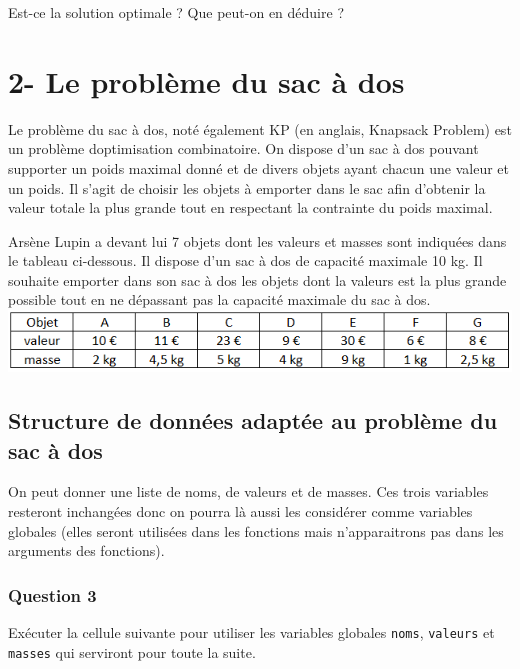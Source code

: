 \documentclass[
  paper=a4,
  ,captions=tableheading
]{scrartcl}
\begin{document}
Est-ce la solution optimale ? Que peut-on en déduire ?

\hypertarget{2--le-probluxe8me-du-sac-uxe0-dos}{%
\section{2- Le problème du sac à
dos}\label{2--le-probluxe8me-du-sac-uxe0-dos}}

Le problème du sac à dos, noté également KP (en anglais, Knapsack
Problem) est un problème d\textquotesingle optimisation combinatoire. On
dispose d'un sac à dos pouvant supporter un poids maximal donné et de
divers objets ayant chacun une valeur et un poids. Il s'agit de choisir
les objets à emporter dans le sac afin d'obtenir la valeur totale la
plus grande tout en respectant la contrainte du poids maximal.

Arsène Lupin a devant lui 7 objets dont les valeurs et masses sont
indiquées dans le tableau ci-dessous. Il dispose d'un sac à dos de
capacité maximale 10 kg. Il souhaite emporter dans son sac à dos les
objets dont la valeurs est la plus grande possible tout en ne dépassant
pas la capacité maximale du sac à dos.
\includegraphics{images/2-image.png}

\hypertarget{structure-de-donnuxe9es-adaptuxe9e-au-probluxe8me-du-sac-uxe0-dos}{%
\subsection{Structure de données adaptée au problème du sac à
dos}\label{structure-de-donnuxe9es-adaptuxe9e-au-probluxe8me-du-sac-uxe0-dos}}

On peut donner une liste de noms, de valeurs et de masses. Ces trois
variables resteront inchangées donc on pourra là aussi les considérer
comme variables globales (elles seront utilisées dans les fonctions mais
n'apparaitrons pas dans les arguments des fonctions).

\hypertarget{question-3}{%
\subsubsection{Question 3}\label{question-3}}

Exécuter la cellule suivante pour utiliser les variables globales
\texttt{noms}, \texttt{valeurs} et \texttt{masses} qui serviront pour
toute la suite.
\end{document}

